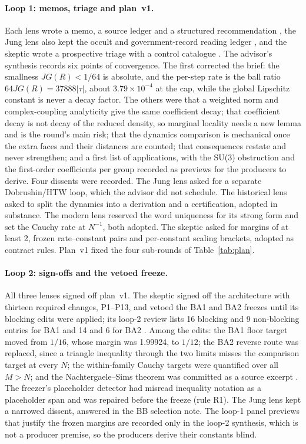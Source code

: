 \paragraph{Loop 1: memos, triage and plan~v1.} Each lens wrote a memo, a
source ledger and a structured recommendation \cite{r33lenses}, the Jung lens
also kept the occult and government-record reading ledger \cite{r33occult},
and the skeptic wrote a prospective triage with a control catalogue
\cite{r33skeptic}. The advisor's synthesis records six points of
convergence. The first corrected the brief: the smallness $JG(R)<1/64$ is
absolute, and the per-step rate is the ball ratio $64JG(R)=37888|\tau|$,
about $3.79\times10^{-4}$ at the cap, while the global Lipschitz constant is
never a decay factor. The others were that a weighted norm and complex-coupling
analyticity give the same coefficient decay; that coefficient decay is not
decay of the reduced density, so marginal locality needs a new lemma and is
the round's main risk; that the dynamics comparison is mechanical once the
extra faces and their distances are counted; that consequences restate and
never strengthen; and a first list of applications, with the SU(3)
obstruction and the first-order coefficients per group recorded as previews
for the producers to derive. Four dissents were recorded. The Jung lens
asked for a separate Dobrushin/HTW loop, which the advisor did not schedule.
The historical lens asked to split the dynamics into a derivation and a
certification, adopted in substance. The modern lens reserved the word
uniqueness for its strong form and set the Cauchy rate at $N^{-1}$, both
adopted. The skeptic asked for margins of at least 2, frozen rate--constant
pairs and per-constant scaling brackets, adopted as contract rules. Plan~v1
fixed the four sub-rounds of Table~\ref{tab:plan}.

\paragraph{Loop 2: sign-offs and the vetoed freeze.} All three lenses signed
off plan~v1. The skeptic signed off the architecture with thirteen required
changes, P1--P13, and vetoed the BA1 and BA2 freezes until its blocking edits
were applied; its loop-2 review lists 16 blocking and 9 non-blocking entries
for BA1 and 14 and 6 for BA2 \cite{r33skeptic}. Among the edits: the BA1
floor target moved from $1/16$, whose margin was 1.99924, to $1/12$; the BA2
reverse route was replaced, since a triangle inequality through the two
limits misses the comparison target at every $N$; the within-family Cauchy
targets were quantified over all $M>N$; and the Nachtergaele--Sims theorem was
committed as a source excerpt \cite{ns}. The freezer's placeholder detector
had misread inequality notation as a placeholder span and was repaired
before the freeze (rule R1). The Jung lens kept a narrowed dissent, answered
in the BB selection note. The loop-1 panel previews that justify the frozen
margins are recorded only in the loop-2 synthesis, which is not a producer
premise, so the producers derive their constants blind.


